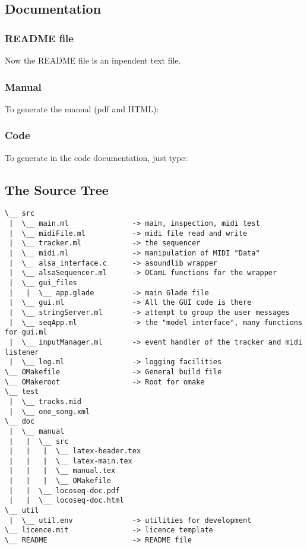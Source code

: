 \subsection{Documentation}

\subsubsection{README file}

Now the README file is an inpendent text file.

\subsubsection{Manual}

To generate the manual (pdf and HTML):


\subsubsection{Code}

To generate in  the code documentation, just type:



\subsection{The Source Tree}

\begin{verbatim}
\__ src                                        
 |  \__ main.ml               -> main, inspection, midi test
 |  \__ midiFile.ml           -> midi file read and write
 |  \__ tracker.ml            -> the sequencer
 |  \__ midi.ml               -> manipulation of MIDI "Data"
 |  \__ alsa_interface.c      -> asoundlib wrapper
 |  \__ alsaSequencer.ml      -> OCamL functions for the wrapper
 |  \__ gui_files                   
 |   |  \__ app.glade         -> main Glade file
 |  \__ gui.ml                -> All the GUI code is there
 |  \__ stringServer.ml       -> attempt to group the user messages
 |  \__ seqApp.ml             -> the "model interface", many functions for gui.ml 
 |  \__ inputManager.ml       -> event handler of the tracker and midi listener
 |  \__ log.ml                -> logging facilities
\__ OMakefile                 -> General build file
\__ OMakeroot                 -> Root for omake
\__ test                                       
 |  \__ tracks.mid  
 |  \__ one_song.xml                             
\__ doc
 |  \__ manual
 |   |  \__ src
 |   |   |  \__ latex-header.tex
 |   |   |  \__ latex-main.tex
 |   |   |  \__ manual.tex
 |   |   |  \__ OMakefile
 |   |  \__ locoseq-doc.pdf
 |   |  \__ locoseq-doc.html
\__ util                      
 |  \__ util.env              -> utilities for development
\__ licence.mit               -> licence template
\__ README                    -> README file
\end{verbatim}


